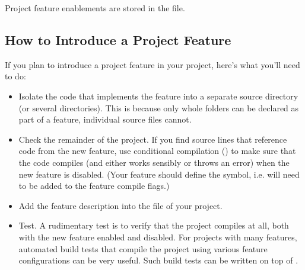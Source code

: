 Project feature enablements are stored in the  file.

\subsection{How to Introduce a Project Feature}
\label{sec:build-sim-progs:introducing-project-features}

If you plan to introduce a project feature in your project, here's what you'll need
to do:

\begin{itemize}
  \item Isolate the code that implements the feature into a separate source directory
        (or several directories). This is because only whole folders can be
        declared as part of a feature, individual source files cannot.

  \item Check the remainder of the project. If you find source lines that reference
        code from the new feature, use conditional compilation ()
        to make sure that the code compiles (and either works sensibly or throws an error)
        when the new feature is disabled. (Your feature should define the 
        symbol, i.e.  will need to be added to the feature compile flags.)

  \item Add the feature description into the  file of your project.

  \item Test. A rudimentary test is to verify that the project compiles at all,
        both with the new feature enabled and disabled. For projects with many
        features, automated build tests that compile the project using various
        feature configurations can be very useful. Such build tests can be
        written on top of .
        
\end{itemize}

